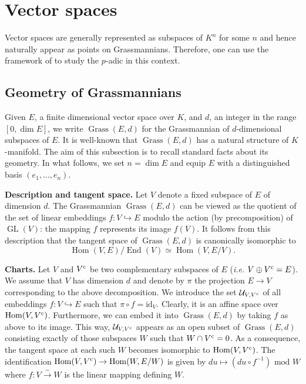 \documentclass{sig-alternate}
\DeclareMathOperator{\Hom}{Hom}
\DeclareMathOperator{\End}{End}
\DeclareMathOperator{\GL}{GL}
\DeclareMathOperator{\Grass}{Grass}
\newcommand{\id}{\textrm{id}}
\renewcommand{\c}{\text{\rm c}}
\begin{document}
\section{Vector spaces}
\label{sec:vectorspaces}

Vector spaces are generally represented as subspaces of $K^n$ for some 
$n$ and hence naturally appear as points on Grassmannians. Therefore, 
one can use the framework of \cite[Appendix A]{caruso-roe-vaccon:14a} to 
study the $p$-adic in this context.

\subsection{Geometry of Grassmannians}
\label{ssec:grassgeo}

Given $E$, a finite dimensional vector space over $K$, and $d$, an 
integer in the range $[0, \dim E]$, we write $\Grass(E,d)$ for the
Grassmannian of $d$-dimensional subspaces of $E$. It is well-known
that $\Grass(E,d)$ has a natural structure of $K$-manifold. The aim of
this subsection is to recall standard facts about its geometry. In what follows,
we set $n = \dim E$ and equip $E$ with a distinguished basis
$(e_1, \ldots, e_n)$.

\smallskip

\noindent
{\bf Description and tangent space.}
Let $V$ denote a fixed subspace of $E$ of dimension $d$. The 
Grassmannian $\Grass(E,d)$ can be viewed as the quotient of the set 
of linear embeddings $f: V \hookrightarrow E$ modulo the action (by 
precomposition) of $\GL(V)$: the mapping $f$ represents its image 
$f(V)$. It follows from this description that the tangent space of 
$\Grass(E,d)$ is canonically isomorphic to $$\Hom(V, E) / \End(V) 
\simeq \Hom(V, E/V).$$

\smallskip

\noindent
{\bf Charts.}
Let $V$ and $V^\c$ be two complementary subspaces of $E$ 
(\emph{i.e.} $V \oplus V^\c = E$). We assume that $V$ has 
dimension $d$ and denote by $\pi$ the projection $E \to V$ 
corresponding to the above decomposition. We introduce the set 
$\mathcal U_{V,V^\c}$ of all embeddings $f : V \hookrightarrow E$ 
such that $\pi \circ f = \id_V$. Clearly, it is an affine space over
$\Hom(V,V^\c)$. 
Furthermore, we can embed it into $\Grass(E,d)$ by taking $f$ as
above to its image. This way, $\mathcal U_{V,V^\c}$ appears as
an open subset of $\Grass(E,d)$ consisting exactly of those subspaces 
$W$ such that $W \cap V^\c = 0$. As a consequence, the tangent space 
at each such $W$ becomes isomorphic to $\Hom(V,V^\c)$. The
identification $\Hom(V,V^\c) \to \Hom(W, E/W)$ is given by
$du \mapsto (du \circ f^{-1}) \text{ mod } W$ where $f : V 
\stackrel{\sim}{\to} W$ is the linear mapping defining $W$.
\end{document}
